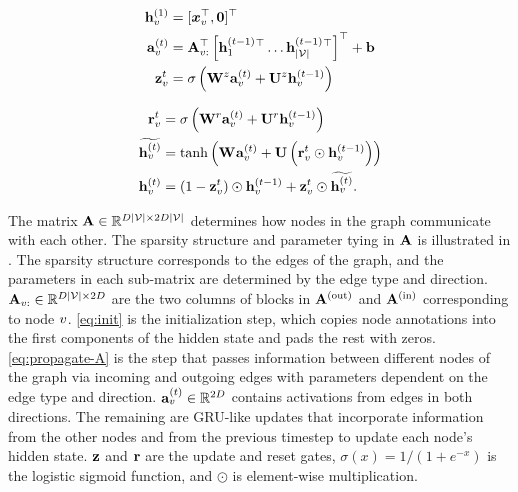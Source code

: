\documentclass{article}
\begin{document}
\begin{center}
\small
\begin{minipage}{.48\linewidth}
\begin{align}
    \mathbf{h}_{v}^{(1)} & = [\boldsymbol{x}_v^\top, \mathbf{0}]^\top \label{eq:init}\\
    \mathbf{a}_{v}^{(t)} & = 
    \mathbf{A}_{v:}^\top  \left[\mathbf{h}_{1}^{(t-1)}{}^\top \ldots
\mathbf{h}_{|\mathcal{V}|}^{(t-1)}{}^\top\right]^\top + \mathbf{b} \label{eq:propagate-A} \\
    \mathbf{z}_{v}^{t} & =
    \sigma\left(\mathbf{W}_{}^{z}\mathbf{a}_{v}^{(t)} +
    \mathbf{U}^{z}\mathbf{h}_{v}^{(t-1)}\right) \label{eq:update-gate}
\end{align}
\end{minipage}
\hfill
\begin{minipage}{.48\linewidth}
\begin{align}
    \mathbf{r}_{v}^{t} & =
    \sigma\left(\mathbf{W}_{}^{r}\mathbf{a}_{v}^{(t)} +
    \mathbf{U}^{r}\mathbf{h}_{v}^{(t-1)}\right) \label{eq:reset-gate} \\
    \widetilde{\mathbf{h}_{v}^{(t)}} & =
    \mathrm{tanh}\left(\mathbf{W}_{}\mathbf{a}_{v}^{(t)} +
    \mathbf{U}\left(\mathbf{r}_{v}^{t}\odot\mathbf{h}_{v}^{(t-1)}\right)\right)
    \\
    \mathbf{h}_{v}^{(t)} & = (1 - \mathbf{z}_{v}^{t})\odot
    \mathbf{h}_{v}^{(t-1)} + \mathbf{z}_{v}^{t}\odot
    \widetilde{\mathbf{h}_{v}^{(t)}}.
\end{align}
\end{minipage}
\end{center}

The matrix $\mathbf{A} \in \mathbb{R}^{D|\mathcal{V}| \times 2 D |\mathcal{V}|}$ determines
how nodes in the graph communicate with each other. The sparsity
structure and parameter tying in $\mathbf{A}$ is illustrated in
. The sparsity structure corresponds to the
edges of the graph, and the parameters in each
sub-matrix are determined by the edge type and direction.
$\mathbf{A}_{v:} \in \mathbb{R}^{D|\mathcal{V}| \times 2 D}$ are the two columns of blocks
in $\mathbf{A}^{(\mathrm{out})}$ and $\mathbf{A}^{(\mathrm{in})}$ corresponding to node $v$.
\eqref{eq:init} is the initialization step, which copies node annotations
into the first components of the hidden state and pads the rest with
zeros.  \eqref{eq:propagate-A} is the step that passes information
between different nodes of the graph via incoming and outgoing edges
with parameters dependent on the edge type and direction.
$\mathbf{a}_{v}^{(t)}\in\mathbb{R}^{2D}$ contains activations from edges in both
directions.
The remaining are GRU-like updates that incorporate information from the
other nodes and from the previous timestep to update each node's
hidden state.  $\mathbf{z}$ and $\mathbf{r}$ are the update and
reset gates, $\sigma(x)=1/(1+e^{-x})$ is the logistic sigmoid
function, and $\odot$ is element-wise multiplication. %
\end{document}
